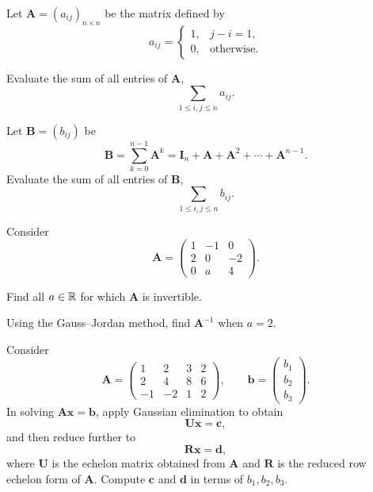 \begin{problem}
Let $\mathbf A=(a_{ij})_{n\times n}$ be the matrix defined by
\[
a_{ij}=
\begin{cases}
1, & j-i=1,\\
0, & \text{otherwise}.
\end{cases}
\]
\begin{problemsubparts}
\item Evaluate the sum of all entries of $\mathbf A$,
\[
\sum_{1\le i,j\le n} a_{ij}.
\]
\item Let $\mathbf B=(b_{ij})$ be
\[
\mathbf B=\sum_{k=0}^{n-1}\mathbf A^k
=\mathbf I_n+\mathbf A+\mathbf A^2+\cdots+\mathbf A^{n-1}.
\]
Evaluate the sum of all entries of $\mathbf B$,
\[
\sum_{1\le i,j\le n} b_{ij}.
\]
\end{problemsubparts}
\end{problem}

\begin{problem}
Consider
\[
\mathbf A=
\begin{pmatrix}
1&-1&0\\
2&0&-2\\
0&a&4
\end{pmatrix}.
\]
\begin{problemsubparts}
\item Find all $a\in\mathbb{R}$ for which $\mathbf A$ is invertible.
\item Using the Gauss--Jordan method, find $\mathbf A^{-1}$ when $a=2$.
\end{problemsubparts}
\end{problem}

\begin{problem}
Consider
\[
\mathbf A=
\begin{pmatrix}
1&2&3&2\\
2&4&8&6\\
-1&-2&1&2
\end{pmatrix},
\qquad
\mathbf b=
\begin{pmatrix}
b_1\\b_2\\b_3
\end{pmatrix}.
\]
In solving $\mathbf A\mathbf x=\mathbf b$, apply Gaussian elimination to obtain
\[
\mathbf U\mathbf x=\mathbf c,
\]
and then reduce further to
\[
\mathbf R\mathbf x=\mathbf d,
\]
where $\mathbf U$ is the echelon matrix obtained from $\mathbf A$ and $\mathbf R$ is the reduced row echelon form of $\mathbf A$. Compute $\mathbf c$ and $\mathbf d$ in terms of $b_1,b_2,b_3$.
\end{problem}

